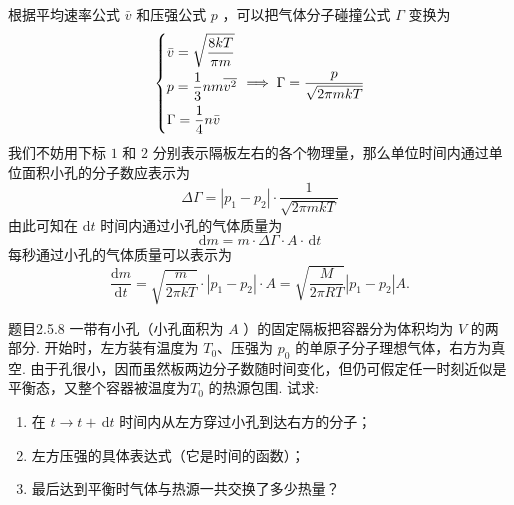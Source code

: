 \begin{solution}
    根据平均速率公式 $\bar{v}$ 和压强公式 $p$ ，可以把气体分子碰撞公式 $\Gamma$ 变换为
    $$
        \begin{dcases}
            \bar{v} = \sqrt{\frac{8kT}{\pi m}} \\
            p = \frac{1}{3}nm\overline{v^2}    \\
            \Gamma = \frac{1}{4} n \bar{v}
        \end{dcases}
        \implies \Gamma = \frac{p}{\sqrt{2\pi mkT}}
    $$
    我们不妨用下标 $1$ 和 $2$ 分别表示隔板左右的各个物理量，那么单位时间内通过单位面积小孔的分子数应表示为
    $$
        \Delta \Gamma = |p_1 - p_2| \cdot \frac{1}{\sqrt{2\pi mkT}}
    $$
    由此可知在 $\mathrm{d}t$ 时间内通过小孔的气体质量为
    $$
        \mathrm{d}m = m \cdot \Delta\Gamma \cdot A \cdot \,\mathrm{d}t
    $$
    每秒通过小孔的气体质量可以表示为
    $$
        \frac{\mathrm{d}m}{\mathrm{d}t} = \sqrt{\frac{m}{2\pi kT}} \cdot|p_1-p_2| \cdot A = \sqrt{\frac{M}{2\pi RT}} |p_1 - p_2| A.
    $$
\end{solution}

\begin{question}{题目2.5.8}
    一带有小孔（小孔面积为 $A$ ）的固定隔板把容器分为体积均为 $V$ 的两部分. 开始时，左方装有温度为 $T_0$、压强为 $p_0$ 的单原子分子理想气体，右方为真空. 由于孔很小，因而虽然板两边分子数随时间变化，但仍可假定任一时刻近似是平衡态，又整个容器被温度为$T_0$ 的热源包围. 试求:
    \begin{enumerate}
        \item[(1)] 在 $t \to t+\,\mathrm{d}t$ 时间内从左方穿过小孔到达右方的分子；
        \item[(2)] 左方压强的具体表达式（它是时间的函数）；
        \item[(3)] 最后达到平衡时气体与热源一共交换了多少热量？
    \end{enumerate}
\end{question}

